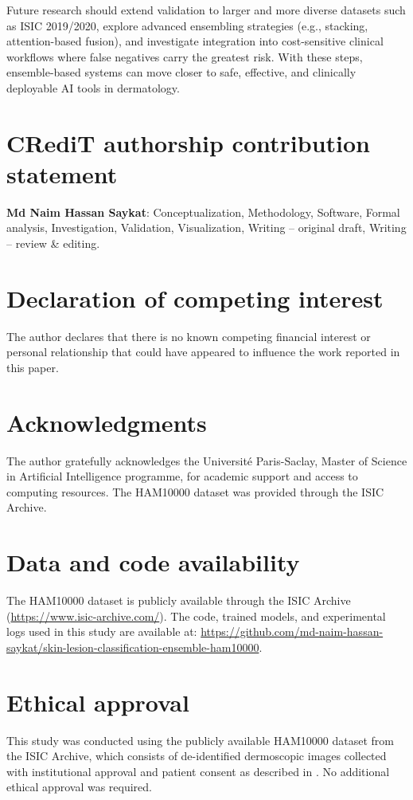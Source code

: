 \documentclass[preprint,12pt]{elsarticle}
\begin{document}
Future research should extend validation to larger and more diverse datasets such as ISIC 2019/2020, 
explore advanced ensembling strategies (e.g., stacking, attention-based fusion), 
and investigate integration into cost-sensitive clinical workflows where false negatives carry the greatest risk. 
With these steps, ensemble-based systems can move closer to safe, effective, and clinically deployable 
AI tools in dermatology.

\section*{CRediT authorship contribution statement}
\textbf{Md Naim Hassan Saykat}: Conceptualization, Methodology, Software, Formal analysis, 
Investigation, Validation, Visualization, Writing – original draft, Writing – review \& editing.  

\section*{Declaration of competing interest}
The author declares that there is no known competing financial interest or personal relationship 
that could have appeared to influence the work reported in this paper.  

\section*{Acknowledgments}
The author gratefully acknowledges the Université Paris-Saclay, Master of Science in Artificial Intelligence programme, 
for academic support and access to computing resources.  
The HAM10000 dataset was provided through the ISIC Archive.  

\section*{Data and code availability}
The HAM10000 dataset is publicly available through the ISIC Archive 
(\href{https://www.isic-archive.com/}{https://www.isic-archive.com/}).  
The code, trained models, and experimental logs used in this study are available at:  
\href{https://github.com/md-naim-hassan-saykat/skin-lesion-classification-ensemble-ham10000}{https://github.com/md-naim-hassan-saykat/skin-lesion-classification-ensemble-ham10000}.  

\section*{Ethical approval}
This study was conducted using the publicly available HAM10000 dataset from the ISIC Archive, 
which consists of de-identified dermoscopic images collected with institutional approval and patient consent 
as described in \citep{tschandl2018ham10000}.  
No additional ethical approval was required.

    
\end{document}
